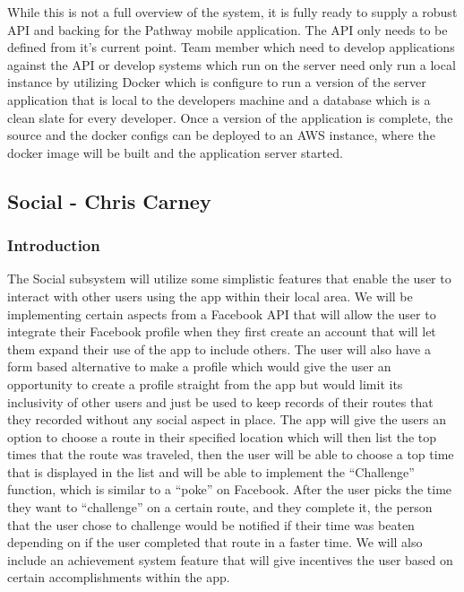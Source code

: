 \documentclass{article}
\begin{document}
While this is not a full overview of the system, it is fully ready to supply a robust
API and backing for the Pathway mobile application. The API only needs to be defined
from it's current point. Team member which need to develop applications against the API
or develop systems which run on the server need only run a local instance by utilizing
Docker which is configure to run a version of the server application that is local to the
developers machine and a database which is a clean slate for every developer. Once
a version of the application is complete, the source and the docker configs can be deployed
to an AWS instance, where the docker image will be built and the application server started.


\subsection{Social - Chris Carney}
\subsubsection{Introduction}
The Social subsystem will utilize some simplistic features that enable the user to interact with other users using the app within their local area. We will be implementing certain aspects from a Facebook API that will allow the user to integrate their Facebook profile when they first create an account that will let them expand their use of the app to include others. The user will also have a form based alternative to make a profile which would give the user an opportunity to create a profile straight from the app but would limit its inclusivity of other users and just be used to keep records of their routes that they recorded without any social aspect in place.
The app will give the users an option to choose a route in their specified location which will then list the top times that the route was traveled, then the user will be able to choose a top time that is displayed in the list and will be able to implement the “Challenge” function, which is similar to a “poke” on Facebook. After the user picks the time they want to “challenge” on a certain route, and they complete it, the person that the user chose to challenge would be notified if their time was beaten depending on if the user completed that route in a faster time.
We will also include an achievement system feature that will give incentives the user based on certain accomplishments within the app.
\end{document}
